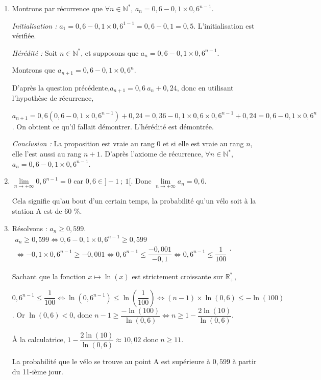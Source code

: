 \documentclass[10pt]{article}
\providecommand{\R}{\mathbb{R}}
\providecommand{\N}{\mathbb{N}}
\begin{document}
\begin{enumerate}
\begin{enumerate}
		$\forall n\in \N^*$, $\begin{gathered}a_{n+1}=p(A_{n+1}\cap A_n)+p(A_{n+1}\cap B_n)=p_{A_n}(A_{n+1})\times p(A_n)+p_{B_n}(A_{n+1})\times p(B_n)\\=0,84\times p(A_n)+0,24\times p(B_n)=0,84~a_n+0,24~b_n\end{gathered}$. Or $\forall n\in \N^*$, $b_n=1-a_n$.
		
		Donc $\forall n\in \N^*$, $a_{n+1}=0,84~a_n+0,24(1-a_n)=0,6~a_n+0,24$
		\item Montrons par récurrence que $\forall n \in \N^*$, $a_n = 0,6 - 0,1 \times 0,6^{n - 1}$.
						
		\textit{Initialisation :} $a_1=0,6 - 0,1 \times 0,6^{1 - 1}=0,6-0,1=0,5$. L'initialisation est vérifiée.
				
		\textit{Hérédité :} Soit  $n \in \N^*$, et supposons que $a_n = 0,6 - 0,1 \times 0,6^{n - 1}$.
		
		Montrons que $a_{n+1} = 0,6 - 0,1 \times 0,6^{n}$.
				
		D'après la question précédente,$a_{n+1}=0,6~a_n+0,24$, donc en utilisant l'hypothèse de récurrence,
		
		$a_{n+1}=0,6\left(0,6 - 0,1 \times 0,6^{n - 1}\right)+0,24=0,36-0,1\times0,6 \times0,6^{n - 1}+0,24=0,6-0,1\times 0,6^n $. On obtient ce qu'il fallait démontrer. L'hérédité est démontrée.
				
		\textit{Conclusion : }  La proposition est vraie au rang $0$ et si elle est vraie au rang $n$, elle l'est aussi au rang $n + 1$.	D'après l'axiome de récurrence, $\forall n \in \N^*$, $a_n = 0,6 - 0,1 \times 0,6^{n - 1}$.
		\item $\displaystyle\lim\limits_{n \rightarrow +\infty} 0,6^{n-1}=0$ car $0,6\in ]-1~;~1[$. Donc $\displaystyle\lim\limits_{n \rightarrow +\infty} a_n=0,6$.
		
		Cela signifie qu'au bout d'un certain temps, la probabilité qu'un vélo soit à la station A est de 60 \%.
		\item Résolvons : $a_n\geqslant 0,599$.
		$\begin{gathered}a_n\geqslant 0,599\iff  0,6 - 0,1 \times 0,6^{n - 1} \geqslant 0,599 \\
		\iff - 0,1 \times 0,6^{n - 1} \geqslant -0,001 \iff 0,6^{n - 1} \leqslant \dfrac{-0,001}{-0,1} \iff 0,6^{n - 1} \leqslant \dfrac{1}{100} \end{gathered}$.
		
		Sachant que la fonction $x\mapsto\ln(x)$ est strictement croissante sur $\R_+^*$, 
		
		$0,6^{n - 1} \leqslant \dfrac{1}{100} \iff \ln\left(0,6^{n - 1} \right) \leqslant \ln\left(\dfrac{1}{100}\right) \iff (n-1)\times \ln(0,6) \leqslant -\ln(100)$. Or $\ln(0,6)<0$, donc
		$n-1 \geqslant \dfrac{-\ln(100)}{\ln(0,6)} \iff n \geqslant 1-\dfrac{2\ln(10)}{\ln(0,6)}$.
		
		À la calculatrice, $1-\dfrac{2\ln(10)}{\ln(0,6)}\approx 10,02$ donc $n\geqslant 11$.
		
		La probabilité que le vélo se trouve au point A est supérieure à $0,599$ à partir du 11-ième jour.
		\end{enumerate}
\end{enumerate}

\bigskip
\end{document}
